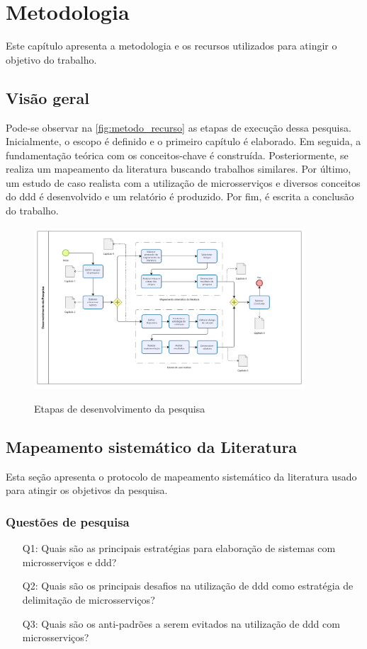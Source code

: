 \chapter{Metodologia}
\label{cap:metodologia}
Este capítulo apresenta a metodologia e os recursos utilizados para atingir o objetivo do trabalho.

\section{Visão geral}
Pode-se observar na \autoref{fig:metodo_recurso} as etapas de execução dessa pesquisa. Inicialmente, o escopo é definido e o primeiro capítulo é elaborado. Em seguida, a fundamentação teórica com os conceitos-chave é construída. Posteriormente, se realiza um mapeamento da literatura buscando trabalhos similares. Por último, um estudo de caso realista com a utilização de microsserviços e diversos conceitos do \acrshort{ddd} é desenvolvido e um relatório é produzido. Por fim, é escrita a conclusão do trabalho.

\begin{figure}[h]
    \centering
    \caption{Etapas de desenvolvimento da pesquisa}
    \includegraphics[width=0.9\textwidth]{media/bpmn_metodo_recurso.png}
    \label{fig:metodo_recurso}
\end{figure}

\section{Mapeamento sistemático da Literatura}
Esta seção apresenta o protocolo de mapeamento sistemático da literatura usado para atingir os objetivos da pesquisa.

\subsection{Questões de pesquisa}
\label{section:questoes_pesquisa}
\begin{enumerate}
    \item[Q1:] Quais são as principais estratégias para elaboração de sistemas com microsserviços e \acrshort{ddd}?
    \item[Q2:] Quais são os principais desafios na utilização de \acrshort{ddd} como estratégia de delimitação de microsserviços?
    \item[Q3:] Quais são os anti-padrões a serem evitados na utilização de \acrshort{ddd} com microsserviços?
    
\end{enumerate}

